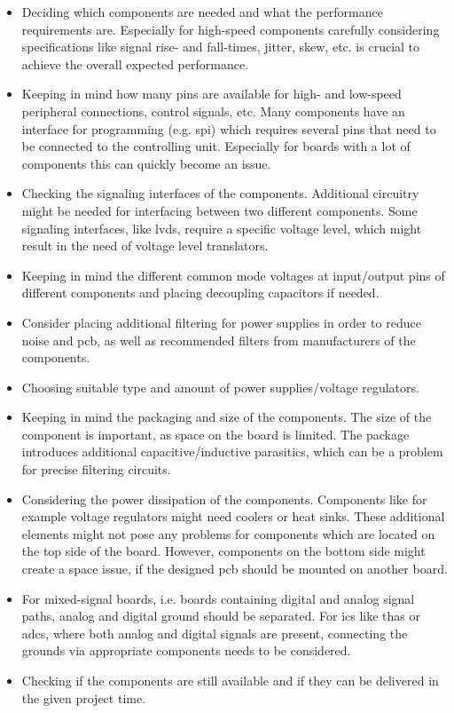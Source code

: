 \begin{itemize}
	\item Deciding which components are needed and what the performance requirements are. Especially for high-speed components carefully considering specifications like signal rise- and fall-times, jitter, skew, etc. is crucial to achieve the overall expected performance.
	\item Keeping in mind how many pins are available for high- and low-speed peripheral connections, control signals, etc. Many components have an interface for programming (e.g. \gls{spi}) which requires several pins that need to be connected to the controlling unit. Especially for boards with a lot of components this can quickly become an issue.
	\item Checking the signaling interfaces of the components. Additional circuitry might be needed for interfacing between two different components. Some signaling interfaces, like \gls{lvds}, require a specific voltage level, which might result in the need of voltage level translators.
	\item Keeping in mind the different common mode voltages at input/output pins of different components and placing decoupling capacitors if needed.
	\item Consider placing additional filtering for power supplies in order to reduce noise and \gls{pcb}, as well as recommended filters from manufacturers of the components. 
	\item Choosing suitable type and amount of power supplies/voltage regulators.
	\item Keeping in mind the packaging and size of the components. The size of the component is important, as space on the board is limited. The package introduces additional capacitive/inductive parasitics, which can be a problem for precise filtering circuits. 
	\item Considering the power dissipation of the components. Components like for example voltage regulators might need coolers or heat sinks. These additional elements might not pose any problems for components which are located on the top side of the board. However, components on the bottom side might create a space issue, if the designed \gls{pcb} should be mounted on another board.
	\item For mixed-signal boards, i.e. boards containing digital and analog signal paths, analog and digital ground should be separated. For \glspl{ic} like \glspl{tha} or \glspl{adc}, where both analog and digital signals are present, connecting the grounds via appropriate components needs to be considered.
	\item Checking if the components are still available and if they can be delivered in the given project time.
\end{itemize}  

